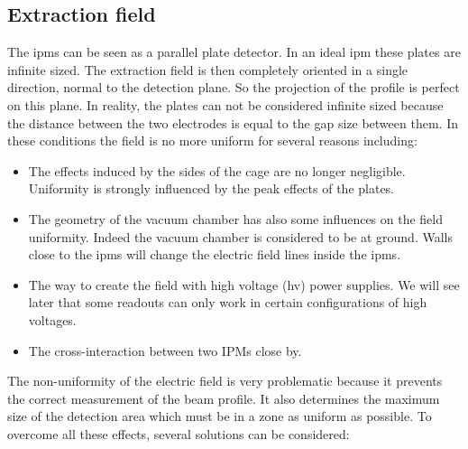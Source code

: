 \begin{refsection}
  \section{Extraction field}
  The \acrshort{ipm}s can be seen as a parallel plate detector. In an ideal \acrshort{ipm} these plates are infinite sized. The extraction field is then completely oriented in a single direction, normal to the detection plane. So the projection of the profile is perfect on this plane. In reality, the plates can not be considered infinite sized because the distance between the two electrodes is equal to the gap size between them. In these conditions the field is no more uniform for several reasons including:
  \begin{itemize}
    \item The effects induced by the sides of the cage are no longer negligible. Uniformity is strongly influenced by the peak effects of the plates.
    \item The geometry of the vacuum chamber has also some influences on the field uniformity. Indeed the vacuum chamber is considered to be at ground. Walls close to the \acrshort{ipm}s will change the electric field lines inside the \acrshort{ipm}s.
    \item The way to create the field with high voltage (\acrshort{hv}) power supplies. We will see later that some readouts can only work in certain configurations of high voltages.
    \item The cross-interaction between two IPMs close by.
  \end{itemize}
  The non-uniformity of the electric field is very problematic because it prevents the correct measurement of the beam profile. It also determines the maximum size of the detection area which must be in a zone as uniform as possible. To overcome all these effects, several solutions can be considered:


\end{refsection}
